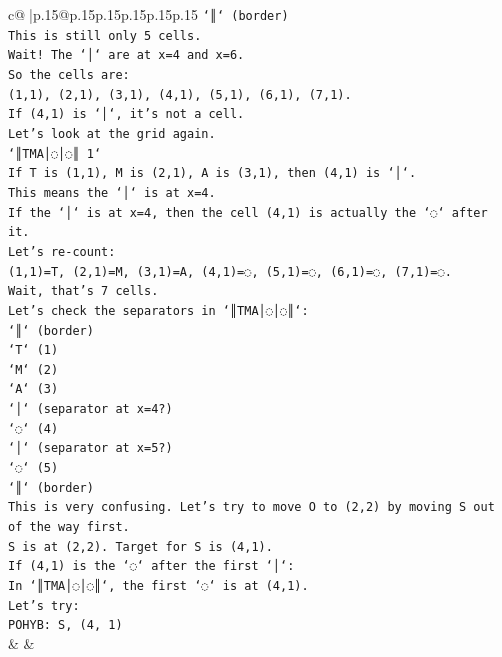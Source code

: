\documentclass{article}
\begin{document}
{\begin{supertabular}{c@{$\;$}|p{.15\linewidth}@{}p{.15\linewidth}p{.15\linewidth}p{.15\linewidth}p{.15\linewidth}p{.15\linewidth}}
{{{\texttt{`║` (border)} \\
\texttt{This is still only 5 cells.} \\
\texttt{Wait! The `│` are at x=4 and x=6.} \\
\texttt{So the cells are:} \\
\texttt{(1,1), (2,1), (3,1), (4,1), (5,1), (6,1), (7,1).} \\
\texttt{If (4,1) is `│`, it's not a cell.} \\
\texttt{Let's look at the grid again.} \\
\texttt{`║TMA│◌│◌║ 1`} \\
\texttt{If T is (1,1), M is (2,1), A is (3,1), then (4,1) is `│`.} \\
\texttt{This means the `│` is at x=4.} \\
\texttt{If the `│` is at x=4, then the cell (4,1) is actually the `◌` after it.} \\
\texttt{Let's re{-}count:} \\
\texttt{(1,1)=T, (2,1)=M, (3,1)=A, (4,1)=◌, (5,1)=◌, (6,1)=◌, (7,1)=◌.} \\
\texttt{Wait, that's 7 cells.} \\
\texttt{Let's check the separators in `║TMA│◌│◌║`:} \\
\texttt{`║` (border)} \\
\texttt{`T` (1)} \\
\texttt{`M` (2)} \\
\texttt{`A` (3)} \\
\texttt{`│` (separator at x=4?)} \\
\texttt{`◌` (4)} \\
\texttt{`│` (separator at x=5?)} \\
\texttt{`◌` (5)} \\
\texttt{`║` (border)} \\
\texttt{This is very confusing. Let's try to move O to (2,2) by moving S out of the way first.} \\
\texttt{S is at (2,2). Target for S is (4,1).} \\
\texttt{If (4,1) is the `◌` after the first `│`:} \\
\texttt{In `║TMA│◌│◌║`, the first `◌` is at (4,1).} \\
\texttt{Let's try:} \\
\texttt{POHYB: S, (4, 1)} \\
            }
        }
    }
    & & \\ \\


\end{supertabular}}
\end{document}
